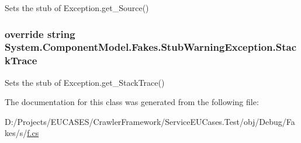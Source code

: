 Sets the stub of Exception.\-get\-\_\-\-Source()

\hypertarget{class_system_1_1_component_model_1_1_fakes_1_1_stub_warning_exception_a346680ff8e167175cb8bd39eba253463}{
\subsubsection[{Stack\-Trace}]{\setlength{\rightskip}{0pt plus 5cm}override string System.\-Component\-Model.\-Fakes.\-Stub\-Warning\-Exception.\-Stack\-Trace\hspace{0.3cm}{\ttfamily [get]}}}\label{class_system_1_1_component_model_1_1_fakes_1_1_stub_warning_exception_a346680ff8e167175cb8bd39eba253463}


Sets the stub of Exception.\-get\-\_\-\-Stack\-Trace()



The documentation for this class was generated from the following file\-:\begin{DoxyCompactItemize}
\item 
D\-:/\-Projects/\-E\-U\-C\-A\-S\-E\-S/\-Crawler\-Framework/\-Service\-E\-U\-Cases.\-Test/obj/\-Debug/\-Fakes/s/\hyperlink{s_2f_8cs}{f.\-cs}\end{DoxyCompactItemize}
